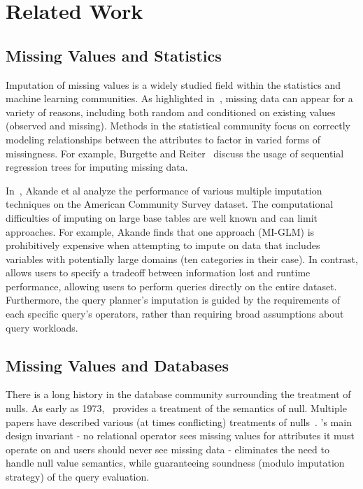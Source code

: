 \section{Related Work}

\subsection{Missing Values and Statistics}

Imputation of missing values is a widely studied field within the statistics and machine
learning communities. As highlighted in~\cite{gelman2006data}, missing data
can appear for a variety of reasons, including both random and conditioned on
existing values (observed and missing). Methods in the statistical community
focus on correctly modeling relationships between the attributes to factor in
varied forms of missingness. For example, Burgette and Reiter~\cite{burgette2010multiple} discuss the usage of sequential regression trees
for imputing missing data.

In~\cite{akande2015empirical}, Akande et al analyze the performance of various
multiple imputation techniques on the American Community Survey dataset. 
The computational difficulties of imputing on large base
tables are well known and can limit approaches. For example, Akande finds that
one approach (MI-GLM) is prohibitively expensive when attempting to impute on data that
includes variables with potentially large domains (ten categories in their case).
In contrast, \ProjectName{} allows users to specify a tradeoff between
information lost and runtime performance, allowing users to perform queries
directly on the entire dataset. Furthermore,
the query planner's imputation is guided by the requirements of each specific
query's operators, rather than requiring broad assumptions about query
workloads.  

\subsection{Missing Values and Databases}
There is a long history in the database community surrounding the
treatment of nulls. As early as 1973,~\cite{codd1973understanding}
provides a treatment of the semantics of null. Multiple
papers have described various (at times conflicting) treatments
of nulls~\cite{grant1977null}. \ProjectName's main design invariant - no relational operator
sees missing values for attributes it must operate on and users should never see
missing data - eliminates
the need to handle null value semantics, while guaranteeing soundness (modulo
imputation strategy) of the query evaluation.


